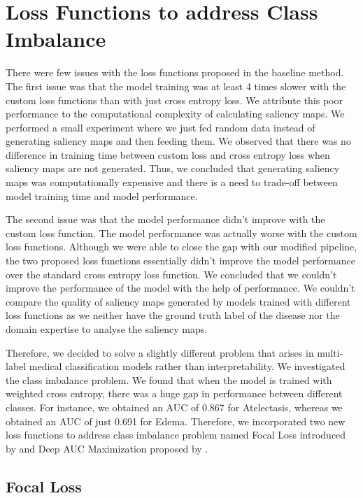 \section{Loss Functions to address Class Imbalance}

There were few issues with the loss functions proposed in the baseline method. The first issue was that the model training was at least 4 times slower with the custom loss functions than with just cross entropy loss. We attribute this poor performance to the computational complexity of calculating saliency maps. We performed a small experiment where we just fed random data instead of generating saliency maps and then feeding them. We observed that there was no difference in training time between custom loss and cross entropy loss when saliency maps are not generated. Thus, we concluded that generating saliency maps was computationally expensive and there is a need to trade-off between model training time and model performance.

The second issue was that the model performance didn't improve with the custom loss function. The model performance was actually worse with the custom loss functions. Although we were able to close the gap with our modified pipeline, the two proposed loss functions essentially didn't improve the model performance over the standard cross entropy loss function. We concluded that we couldn't improve the performance of the model with the help of performance. We couldn't compare the quality of saliency maps generated by models trained with different loss functions as we neither have the ground truth label of the disease nor the domain expertise to analyse the saliency maps. 

Therefore, we decided to solve a slightly different problem that arises in multi-label medical classification models rather than interpretability. We investigated the class imbalance problem. We found that when the model is trained with weighted cross entropy, there was a huge gap in performance between different classes. For instance, we obtained an AUC of 0.867 for Atelectasis, whereas we obtained an AUC of just 0.691 for Edema. Therefore, we incorporated two new loss functions to address class imbalance problem named Focal Loss introduced by \cite{lin2017focal} and Deep AUC Maximization proposed by \cite{yuan2021large}.

\subsection{Focal Loss}

